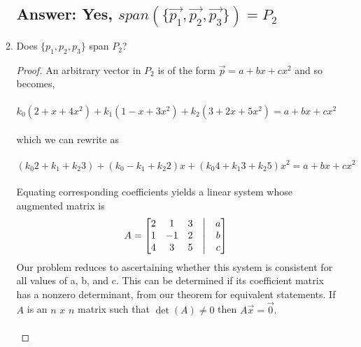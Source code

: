 \documentclass[12pt]{article}
\begin{document}
\begin{enumerate}
\begin{enumerate}
                            \subsection{Answer: Yes, $span(\{\vec{p_{1}},\vec{p_{2}},\vec{p_{3}}\}) = P_{2}$}
                      \item Does $\{p_1,p_2,p_3\}$ span $P_2$?
                            \begin{proof}
                                    An arbitrary vector in $P_{2}$ is of the form $\vec{p}=a+bx+cx^2$ and so becomes,\\\\
                                    $k_{0}(2 + x + 4x^2) +  k_{1}(1 - x + 3x^2) + k_{2}(3 + 2x + 5x^2) = a+bx+cx^2$\\\\
                                    which we can rewrite as \\\\
                                    $(k_{0}2 + k_{1} + k_{2}3) + (k_{0} - k_{1} + k_{2}2)x + (k_{0}4 + k_{1}3 + k_{2}5)x^2 = a+bx+cx^2$\\\\
                                    Equating corresponding coefficients yields a linear system whose augmented matrix is
                                    \begin{align*}
                                            A =
                                            \begin{bmatrix}
                                                    2 & 1  & 3 & \bigm| & a \\
                                                    1 & -1 & 2 & \bigm| & b \\
                                                    4 & 3  & 5 & \bigm| & c \\
                                            \end{bmatrix}
                                    \end{align*}
                                    Our problem reduces to ascertaining whether this system is consistent for
                                    all values of a, b, and c. This can be determined if its coefficient matrix
                                    has a nonzero determinant, from our theorem for equivalent statements.
                                    If $A$ is an $n$ $x$ $n$ matrix such that $\det(A)\neq0$ then $A\vec{x}=\vec{0}.$\\\\

\end{proof}
\end{enumerate}
\end{enumerate}
\end{document}
